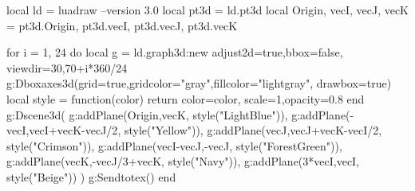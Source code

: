 \documentclass[tikz,border=5pt]{standalone}%
\begin{document}
\begin{luacode*}
local ld = luadraw --version 3.0
local pt3d = ld.pt3d
local Origin, vecI, vecJ, vecK = pt3d.Origin, pt3d.vecI, pt3d.vecJ, pt3d.vecK

for i = 1, 24 do
    local g = ld.graph3d:new{ adjust2d=true,bbox=false, viewdir={30,70+i*360/24} }
    g:Dboxaxes3d({grid=true,gridcolor="gray",fillcolor="lightgray", drawbox=true})
    local style = function(color)
        return {color=color, scale=1,opacity=0.8}
    end
    g:Dscene3d(
        g:addPlane({Origin,vecK}, style("LightBlue")),
        g:addPlane({-vecI,vecI+vecK-vecJ/2}, style("Yellow")),
        g:addPlane({vecJ,vecJ+vecK-vecI/2}, style("Crimson")),
        g:addPlane({vecI-vecJ,-vecJ}, style("ForestGreen")),
        g:addPlane({vecK,-vecJ/3+vecK}, style("Navy")),
        g:addPlane({3*vecI,vecI}, style("Beige"))
    )
    g:Sendtotex()
end
\end{luacode*}
\end{document}
